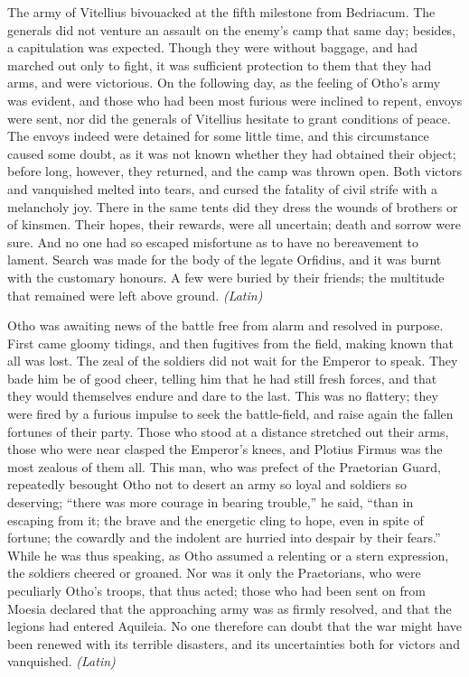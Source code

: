 
The army of Vitellius bivouacked at the fifth milestone from Bedriacum. The generals did not venture an assault on the enemy's camp that same day; besides, a capitulation was expected. Though they were without baggage, and had marched out only to fight, it was sufficient protection to them that they had arms, and were victorious. On the following day, as the feeling of Otho's army was evident, and those who had been most furious were inclined to repent, envoys were sent, nor did the generals of Vitellius hesitate to grant conditions of peace. The envoys indeed were detained for some little time, and this circumstance caused some doubt, as it was not known whether they had obtained their object; before long, however, they returned, and the camp was thrown open. Both victors and vanquished melted into tears, and cursed the fatality of civil strife with a melancholy joy. There in the same tents did they dress the wounds of brothers or of kinsmen. Their hopes, their rewards, were all uncertain; death and sorrow were sure. And no one had so escaped misfortune as to have no bereavement to lament. Search was made for the body of the legate Orfidius, and it was burnt with the customary honours. A few were buried by their friends; the multitude that remained were left above ground. \emph{(Latin)}


Otho was awaiting news of the battle free from alarm and resolved in purpose. First came gloomy tidings, and then fugitives from the field, making known that all was lost. The zeal of the soldiers did not wait for the Emperor to speak. They bade him be of good cheer, telling him that he had still fresh forces, and that they would themselves endure and dare to the last. This was no flattery; they were fired by a furious impulse to seek the battle-field, and raise again the fallen fortunes of their party. Those who stood at a distance stretched out their arms, those who were near clasped the Emperor's knees, and Plotius Firmus was the most zealous of them all. This man, who was prefect of the Praetorian Guard, repeatedly besought Otho not to desert an army so loyal and soldiers so deserving; ``there was more courage in bearing trouble,'' he said, ``than in escaping from it; the brave and the energetic cling to hope, even in spite of fortune; the cowardly and the indolent are hurried into despair by their fears.'' While he was thus speaking, as Otho assumed a relenting or a stern expression, the soldiers cheered or groaned. Nor was it only the Praetorians, who were peculiarly Otho's troops, that thus acted; those who had been sent on from Moesia declared that the approaching army was as firmly resolved, and that the legions had entered Aquileia. No one therefore can doubt that the war might have been renewed with its terrible disasters, and its uncertainties both for victors and vanquished. \emph{(Latin)}

